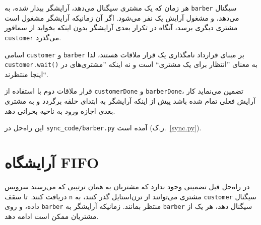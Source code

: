 \documentclass{book}
\newcommand{\clearemptydoublepage}{\newpage\cleardoublepage}
\begin{document}
    هر زمان که  یک مشتری سیگنال می‌دهد، آرایشگر بیدار شده، به  {\tt barber} سیگنال می‌دهد، و مشغول آرایش یک نفر می‌شود. 
    اگر آن زمانیکه آرایشگر مشغول است مشتری دیگری برسد، آنگاه در تکرار بعدی آرایشگر بدون اینکه بخوابد از سمافور {\tt customer} می‌گذرد. 

    اسامی {\tt customer} و {\tt barber} بر مبنای قرارداد نامگذاری یک قرار ملاقات هستند، لذا {\tt customer.wait()} 
    به معنای ''انتظار برای یک مشتری`` است و نه اینکه ''مشتری‌های در اینجا منتظرند``. 

    قرار ملاقات دوم با استفاده از  {\tt customerDone} و {\tt barberDone}، تضمین می‌نماید کار آرایش فعلی تمام شده باشد
    پیش از اینکه آرایشگر به ابتدای حلقه برگردد و به مشتری بعدی اجازه ورود به ناحیه بحرانی دهد. 

    این راه‌حل در \verb"sync_code/barber.py" آمده است (ر.ک.~\ref{sync.py}).

\clearemptydoublepage
\section{آرایشگاه FIFO}

    در راه‌حل قبل تضمینی وجود ندارد که مشتریان به همان ترتیبی که می‌رسند سرویس دریافت کنند.
    تا سقف {\tt n} مشتری می‌توانند از ترن‌استایل گذر کنند، به {\tt customer} سیگنال داده، 
    و روی {\tt barber} منتظر بمانند. زمانیکه آرایشگر به {\tt barber} سیگنال دهد، هر یک از 
    مشتریان ممکن است ادامه دهد.
\end{document}
